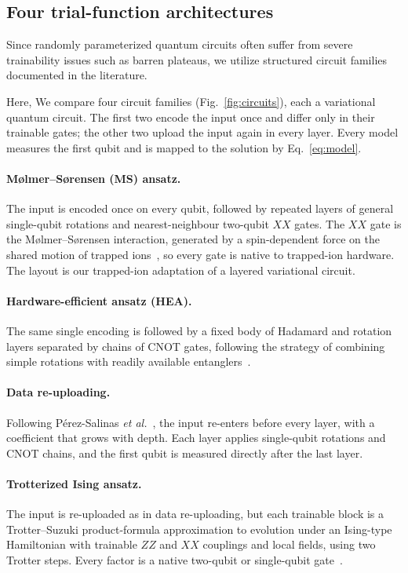 \documentclass[11pt,a4paper]{article}
\begin{document}
\subsection{Four trial-function architectures}

Since randomly parameterized quantum circuits often suffer from severe trainability issues such as barren plateaus, we utilize structured circuit families documented in the literature.

Here, We compare four circuit families (Fig.~\ref{fig:circuits}), each a
variational quantum circuit. The first
two encode the input once and differ only in their trainable gates; the other
two upload the input again in every layer. Every model measures the first qubit
and is mapped to the solution by Eq.~\eqref{eq:model}.

\paragraph{M{\o}lmer--S{\o}rensen (MS) ansatz.}
The input is encoded once on every qubit, followed by repeated layers of
general single-qubit rotations and nearest-neighbour two-qubit $XX$ gates. The
$XX$ gate is the M{\o}lmer--S{\o}rensen interaction, generated by a
spin-dependent force on the shared motion of trapped ions~\cite{sorensen1999},
so every gate is native to trapped-ion hardware. The layout
is our trapped-ion adaptation of a layered variational circuit.

\paragraph{Hardware-efficient ansatz (HEA).}
The same single encoding is followed by a fixed body of Hadamard and rotation
layers separated by chains of CNOT gates, following the strategy of combining
simple rotations with readily available entanglers~\cite{kandala2017draft}.

\paragraph{Data re-uploading.}
Following P\'erez-Salinas \emph{et al.}~\cite{perezsalinas2020}, the input
re-enters before every layer, with a coefficient that grows with depth. Each
layer applies single-qubit rotations and CNOT chains, and the first qubit is
measured directly after the last layer.

\paragraph{Trotterized Ising ansatz.}
The input is re-uploaded as in data re-uploading, but each trainable block is a
Trotter--Suzuki product-formula approximation to evolution
under an Ising-type Hamiltonian with trainable $ZZ$ and $XX$ couplings and local
fields, using two Trotter steps. Every factor is a native two-qubit or
single-qubit gate~\cite{lloyd1996}.
\end{document}
